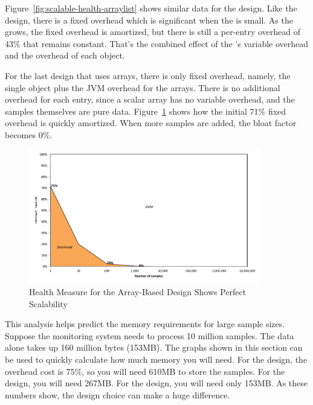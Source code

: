 Figure~\ref{fig:scalable-health-arraylist} shows similar data for the
 design. Like the  design, there is a fixed
overhead which is significant when the  is small. As the
 grows, the fixed overhead is amortized, but there is
still a per-entry overhead of 43\% that remains constant. That's the combined effect of 
the 's variable overhead and the overhead of each 
object.

For the last design that uses arrays, there is only fixed overhead, namely, the
single  object plus the JVM overhead for the arrays. There is no
additional overhead for each entry, since a scalar
array has no variable overhead, and the samples themselves are pure data.
Figure~\ref{fig:scalable-health-array} shows how the initial 71\% fixed overhead is
quickly amortized. When more samples are added, the bloat
factor becomes 0\%.

\begin{figure}
  \centering
  \includegraphics[width=0.9\textwidth]{part1/Figures/memoryhealth/scalable-health-array}
  \caption{Health Measure for the Array-Based Design Shows Perfect Scalability}
  \label{fig:scalable-health-array}
\end{figure}

This analysis helps predict the memory requirements for large sample sizes.
Suppose the monitoring system needs to process 10 million samples. The data
alone takes up 160 million bytes (153MB).  The graphs shown in this section can
be used to quickly calculate how much memory you will need. For the
 design, the overhead cost is 75\%, so you will need 610MB to
store the samples. For the  design, you will need 267MB. For the
 design, you will need only 153MB. As these numbers show, the design
choice can make a huge difference.


